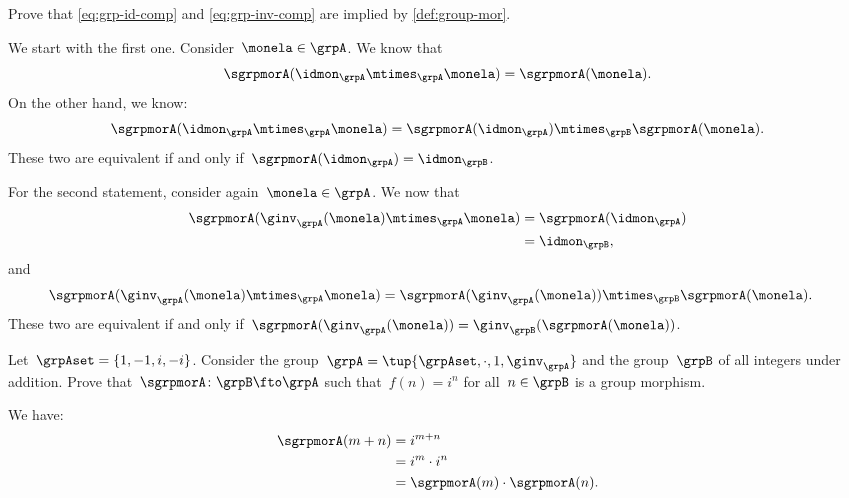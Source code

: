 \begin{exercise}
    Prove that \cref{eq:grp-id-comp} and \cref{eq:grp-inv-comp} are implied by \cref{def:group-mor}.
\end{exercise}
\begin{solution}
    We start with the first one.
    Consider~$\monela \in \grpA$.
    We know that
    \begin{equation*}
        \sgrpmorA(\idmon_\grpA \mtimes_\grpA \monela)=\sgrpmorA(\monela).
    \end{equation*}
    On the other hand, we know:
    \begin{equation*}
        \sgrpmorA(\idmon_\grpA \mtimes_\grpA \monela) = \sgrpmorA(\idmon_\grpA)\mtimes_\grpB \sgrpmorA(\monela).
    \end{equation*}
    These two are equivalent if and only if~$\sgrpmorA(\idmon_\grpA)=\idmon_\grpB$.
    
    For the second statement, consider again~$\monela \in \grpA$.
    We now that
    \begin{equation*}
        \begin{aligned}
            \sgrpmorA(\ginv_{\grpA}(\monela)\mtimes_{\grpA} \monela)&=\sgrpmorA(\idmon_\grpA)\\
            &=\idmon_\grpB,
        \end{aligned}
    \end{equation*}
    and
    \begin{equation*}
        \begin{aligned}
            \sgrpmorA(\ginv_{\grpA}(\monela)\mtimes_{\grpA} \monela)&=\sgrpmorA(\ginv_{\grpA}(\monela))\mtimes_{\grpB} \sgrpmorA(\monela).
        \end{aligned}
    \end{equation*}
    These two are equivalent if and only if~$\sgrpmorA(\ginv_{\grpA}(\monela))=\ginv_{\grpB}(\sgrpmorA(\monela))$.

\end{solution}

\begin{exercise}
    Let~$\grpAset=\{1,-1,i,-i\}$.
    Consider the group~$\grpA=\tup{\grpAset, \cdot, 1, \ginv_\grpA}$ and the group~$\grpB$ of all integers under addition.
    Prove that~$\sgrpmorA\colon \grpB \fto \grpA$ such that~$f(n)=i^n$ for all~$n\in \grpB$ is a group morphism.
\end{exercise}
\begin{solution}
    We have:
    \begin{equation*}
        \begin{aligned}
            \sgrpmorA(m+n)&=i^{m+n}\\
            &=i^m \cdot i^n\\
            &=\sgrpmorA(m)\cdot \sgrpmorA(n).
        \end{aligned}
    \end{equation*}
\end{solution}

